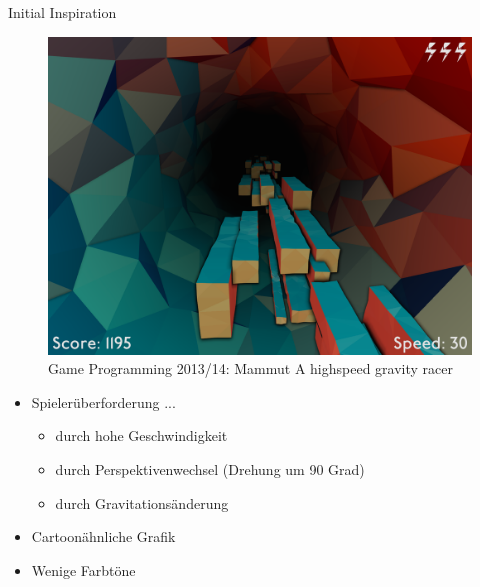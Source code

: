 

\subtitle{Gem Illuminator}



\slidetitle


\slideonetoone
{Initial Inspiration}
{
	\begin{figure}
		\centering
		\includegraphics[width=\textwidth, height=0.7\textheight, keepaspectratio]{images/mammut_cave}
		\caption{Game Programming 2013/14: 
Mammut \linebreak A highspeed gravity racer}
	\end{figure}
}
{
	\begin{itemize}
		\item Spielerüberforderung ...
		 \begin{itemize}
		 	\item durch hohe Geschwindigkeit
		 	\item durch Perspektivenwechsel (Drehung um 90 Grad)
		 	\item durch Gravitationsänderung
		 \end{itemize}
		 \item Cartoonähnliche Grafik 
		 \item Wenige Farbtöne
	\end{itemize}
}

